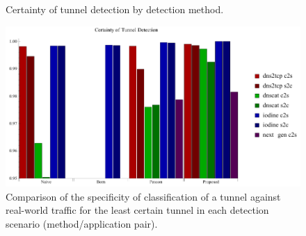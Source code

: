 \documentclass{llncs}
\begin{document}

\begin{figure}[h]
\centering
{}
\caption{Certainty of tunnel detection by detection method.}
\end{figure}

\begin{figure}[h]
\centering
\includegraphics[width=\textwidth]{../figures/cplot3.pdf}
\caption[Chart of Specificity of Detection by Tunnel Application and Detection
Method]{Comparison of the specificity of classification of a tunnel against
real-world traffic for the least certain tunnel in each detection scenario
(method/application pair).}
\label{cplot95}
\end{figure}
\end{document}
